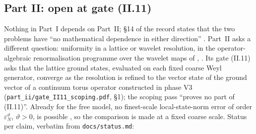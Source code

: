 \subsection{Part II: open at gate (II.11)}\label{sec:part2}

Nothing in Part~I depends on Part~II; \S14 of the record states that the two problems have
``no mathematical dependence in either direction'' . Part~II asks a
different question: uniformity in a lattice or wavelet resolution, in the
operator-algebraic renormalisation programme over the wavelet maps of \cite{MMST}
, . Its gate (II.11) asks that the lattice ground states,
evaluated on each fixed coarse Weyl generator, converge as the resolution is refined to
the vector state of the ground vector of a continuum torus operator constructed in phase
V3 (\texttt{part\_ii/gate\_II11\_scoping.pdf}, \S1); the scoping pass ``proves no part of
(II.11)''. Already for the free model, no finest-scale local-state-norm error of order
$\varepsilon_N^{\vartheta}$, $\vartheta>0$, is possible , so the comparison
is made at a fixed coarse scale. Status per claim, verbatim from \texttt{docs/status.md}:

